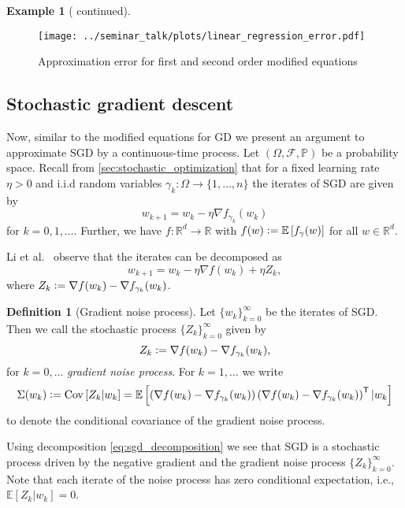 \documentclass[12pt]{article}
\theoremstyle{definition}
\newtheorem{example}[example]{Example}
\newtheorem{definition}[definition]{Definition}
\numberwithin{equation}{section}
\newcommand{\R}{\mathbb{R}}
\newcommand{\BP}{\mathbb{P}}
\newcommand{\CF}{\mathcal{F}}
\newcommand{\T}{\mathsf{T}}
\newcommand{\ev}[1]{\mathbb{E}\left[{#1}\right]}
\newcommand{\defeq}{\vcentcolon=}
\DeclareMathOperator{\Cov}{Cov}
\begin{document}
\begin{example}[ continued]
  \begin{figure}[htb]
    \centering
    \texttt{[image: ../seminar\_talk/plots/linear\_regression\_error.pdf]}
    \caption{Approximation error for first and second order modified equations}
    \label{fig:linear_regression_error}
  \end{figure}
\end{example}
\subsection{Stochastic gradient descent}
\label{sec:smde_sgd}
Now, similar to the modified equations for GD we present an argument to approximate SGD by a continuous-time process.
Let $(\Omega, \CF, \BP)$ be a probability space. Recall from \autoref{sec:stochastic_optimization} that for a fixed learning rate $\eta > 0$ and i.i.d random variables $\gamma_k:\Omega \rightarrow \{1,\dots,n\}$ the iterates of SGD are given by
\begin{equation*}
  w_{k+1} = w_{k} - \eta \nabla f_{\gamma_k}(w_{k})
\end{equation*}
for $k = 0,1,\dots$. Further, we have $f : \R^d \rightarrow \R$ with $f(w) \defeq \ev{f_\gamma(w)}$ for all $w \in \R^d$.

Li et al.\ \cite{liStochasticModifiedEquations2019} observe that the iterates can be decomposed as
\begin{equation}
  \label{eq:sgd_decomposition}
  w_{k+1} = w_{k} - \eta \nabla f(w_{k}) + \eta Z_k,
\end{equation}
where $Z_k \defeq \nabla f(w_{k}) - \nabla f_{\gamma_k}(w_{k})$.

\begin{definition}[Gradient noise process]
  Let $\{w_k\}_{k=0}^\infty$ be the iterates of SGD. Then we call the stochastic process $\{Z_k\}_{k=0}^\infty$ given by
  \begin{equation*}
    Z_k \defeq \nabla f(w_{k}) - \nabla f_{\gamma_k}(w_{k}),
  \end{equation*}
  for $k=0,\dots$ \emph{gradient noise process}. For $k = 1, \dots$ we write 
  \begin{equation*}
    \Sigma(w_k) \defeq \Cov\left[Z_k|w_{k}\right] = \ev{\left(\nabla f(w_{k}) - \nabla f_{\gamma_k}(w_{k})\right)\left(\nabla f(w_{k}) - \nabla f_{\gamma_k}(w_{k})\right)^\T |w_k}
  \end{equation*}
  to denote the conditional covariance of the gradient noise process.
\end{definition}
Using decomposition \eqref{eq:sgd_decomposition} we see that SGD is a stochastic process driven by the negative gradient and the gradient noise process $\{Z_k\}_{k=0}^\infty$. Note that each iterate of the noise process has zero conditional expectation, i.e., $\ev{Z_k|w_{k}} = 0$.
\end{document}
